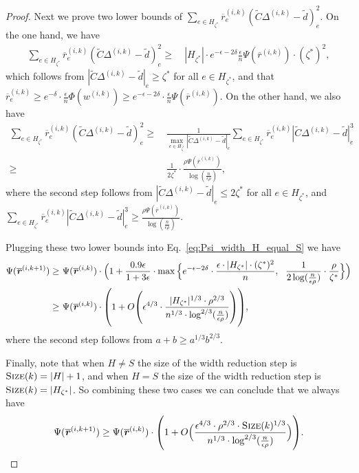 \documentclass[11pt]{article}
\let\originalleft\left
\let\originalright\right
\renewcommand{\left}{\mathopen{}\mathclose\bgroup\originalleft}
\renewcommand{\right}{\aftergroup\egroup\originalright}
\newcommand\dd{\boldsymbol{\mathit{d}}}
\newcommand\rr{\boldsymbol{\mathit{r}}}
\newcommand\ww{\boldsymbol{\mathit{w}}}
\newcommand\CC{\boldsymbol{\mathit{C}}}
\newcommand{\wt}{\widetilde}
\newcommand{\ov}{\overline}
\begin{document}
\begin{proof}
Next we prove two lower bounds of $\sum_{e \in H_{\zeta^*}} \ov{\rr}^{(i,k)}_e (\wt{\CC} \Delta^{(i,k)}-\wt{\dd})_e^2$. On the one hand, we have
\begin{align*}
\sum_{e \in H_{\zeta^*}} \ov{\rr}^{(i,k)}_e (\wt{\CC} \Delta^{(i,k)}-\wt{\dd})_e^2 \geq &~ |H_{\zeta^*}| \cdot e^{-\epsilon - 2\delta} \frac{\epsilon}{n} \Psi(\ov{\rr}^{(i,k)}) \cdot (\zeta^*)^2,
\end{align*}
which follows from $|\wt{\CC} \Delta^{(i,k)} - \wt{\dd}|_e \geq \zeta^*$ for all $e \in H_{\zeta^*}$, and that $\ov{\rr}^{(i,k)}_e \geq e^{-\delta} \cdot \frac{\epsilon}{n} \Phi(\ww^{(i,k)}) \geq e^{-\epsilon-2\delta} \cdot \frac{\epsilon}{n} \Psi(\ov{\rr}^{(i,k)})$. On the other hand, we also have
\begin{align*}
\sum_{e \in H_{\zeta^*}} \ov{\rr}^{(i,k)}_e (\wt{\CC} \Delta^{(i,k)}-\wt{\dd})_e^2 \geq &~ \frac{1}{\max_{e \in H_{\zeta^*}} |\wt{\CC} \Delta^{(i,k)}-\wt{\dd}|_e} \sum_{e \in H_{\zeta^*}} \ov{\rr}^{(i,k)}_e |\wt{\CC} \Delta^{(i,k)}-\wt{\dd}|_e^3 \\
\geq &~ \frac{1}{2 \zeta^*} \cdot \frac{\rho \Psi(\ov{\rr}^{(i,k)})}{\log(\frac{n}{\epsilon \rho})},
\end{align*}
where the second step follows from $|\wt{\CC} \Delta^{(i,k)} - \wt{\dd}|_e \leq 2 \zeta^*$ for all $e \in H_{\zeta^*}$, and $\sum_{e \in H_{\zeta^*}} \ov{\rr}^{(i,k)}_e |\wt{\CC} \Delta^{(i,k)} - \wt{\dd}|_e^3 \geq \frac{\rho \Psi(\ov{\rr}^{(i,k)})}{\log(\frac{n}{\epsilon \rho})}$. 

Plugging these two lower bounds into Eq.~\eqref{eq:Psi_width_H_equal_S} we have
\begin{align*}
\Psi(\ov{\rr}^{(i,k+1)}) \geq &~ \Psi(\ov{\rr}^{(i,k)}) \cdot \Big(1 + \frac{0.9 \epsilon}{1 + 3 \epsilon} \cdot \max\Big\{e^{-\epsilon-2\delta} \cdot \frac{\epsilon \cdot |H_{\zeta^*}|\cdot (\zeta^*)^2}{n},~~ \frac{1}{2 \log(\frac{n}{\epsilon \rho})} \cdot \frac{\rho}{\zeta^*}\Big\} \Big) \\
\geq &~ \Psi(\ov{\rr}^{(i,k)}) \cdot \left(1 + O\left(\epsilon^{4/3} \cdot \frac{|H_{\zeta^*}|^{1/3} \cdot \rho^{2/3}}{n^{1/3} \cdot \log^{2/3}(\frac{n}{\epsilon \rho})} \right) \right),
\end{align*}
where the second step follows from $a+b \geq a^{1/3} b^{2/3}$.

Finally, note that when $H \neq S$ the size of the width reduction step is $\textsc{Size}(k) = |H| + 1$, and when $H = S$ the size of the width reduction step is $\textsc{Size}(k) = |H_{\zeta^*}|$. So combining these two cases we can conclude that we always have
\[
\Psi(\ov{\rr}^{(i,k+1)}) \geq \Psi(\ov{\rr}^{(i,k)}) \cdot \left(1 + O\Big( \frac{\epsilon^{4/3} \cdot \rho^{2/3} \cdot \textsc{Size}(k)^{1/3}}{n^{1/3} \cdot \log^{2/3}(\frac{n}{\epsilon \rho})}\Big) \right). 
\]


\end{proof}
\end{document}
